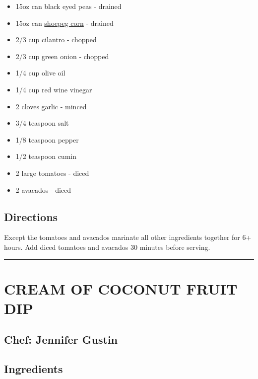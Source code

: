 \documentclass[
]{book}
\providecommand{\tightlist}{%
  \setlength{\itemsep}{0pt}\setlength{\parskip}{0pt}}
\begin{document}
\begin{itemize}
\tightlist
\item
  15oz can black eyed peas - drained
\item
  15oz can \href{https://en.wikipedia.org/wiki/Shoepeg_corn}{shoepeg corn} - drained
\item
  2/3 cup cilantro - chopped
\item
  2/3 cup green onion - chopped
\item
  1/4 cup olive oil
\item
  1/4 cup red wine vinegar
\item
  2 cloves garlic - minced
\item
  3/4 teaspoon salt
\item
  1/8 teaspoon pepper
\item
  1/2 teaspoon cumin
\item
  2 large tomatoes - diced
\item
  2 avacados - diced
\end{itemize}

\hypertarget{directions-1}{%
\subsection*{Directions}\label{directions-1}}


Except the tomatoes and avacados marinate all other ingredients together for 6+ hours. Add diced tomatoes and avacados 30 minutes before serving.

\begin{center}\rule{0.5\linewidth}{0.5pt}\end{center}

\hypertarget{cream-of-coconut-fruit-dip}{%
\section*{CREAM OF COCONUT FRUIT DIP}\label{cream-of-coconut-fruit-dip}}


\hypertarget{chef-jennifer-gustin}{%
\subsection*{Chef: Jennifer Gustin}\label{chef-jennifer-gustin}}


\hypertarget{ingredients-2}{%
\subsection*{Ingredients}\label{ingredients-2}}
\end{document}
